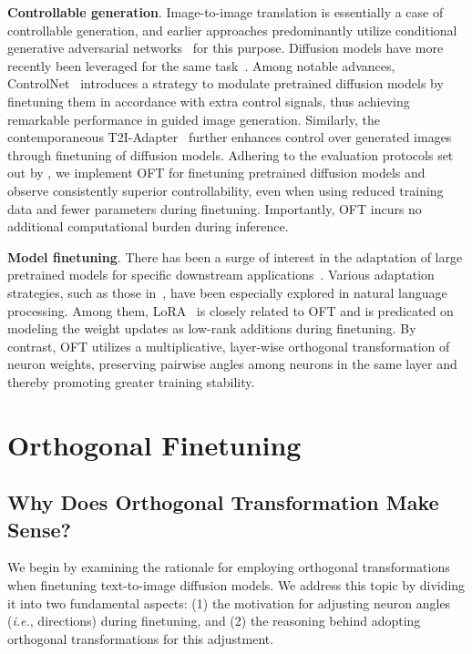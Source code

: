 \textbf{Controllable generation}. Image-to-image translation is essentially a case of controllable generation, and earlier approaches predominantly utilize conditional generative adversarial networks~\cite{isola2017image,zhu2017toward,wang2018high,park2019semantic,choi2018stargan} for this purpose. Diffusion models have more recently been leveraged for the same task~\cite{saharia2022palette,voynov2022sketch,wang2022pretraining}. Among notable advances, ControlNet~\cite{zhang2023adding} introduces a strategy to modulate pretrained diffusion models by finetuning them in accordance with extra control signals, thus achieving remarkable performance in guided image generation. Similarly, the contemporaneous T2I-Adapter~\cite{mou2023t2i} further enhances control over generated images through finetuning of diffusion models. Adhering to the evaluation protocols set out by \cite{zhang2023adding,mou2023t2i}, we implement OFT for finetuning pretrained diffusion models and observe consistently superior controllability, even when using reduced training data and fewer parameters during finetuning. Importantly, OFT incurs no additional computational burden during inference.

\textbf{Model finetuning}. There has been a surge of interest in the adaptation of large pretrained models for specific downstream applications~\cite{devlin2018bert,brown2020language,he2022masked}. Various adaptation strategies, such as those in~\cite{hulora2022,houlsby2019parameter,pfeiffer2020adapterfusion}, have been especially explored in natural language processing. Among them, LoRA~\cite{hulora2022} is closely related to OFT and is predicated on modeling the weight updates as low-rank additions during finetuning. By contrast, OFT utilizes a multiplicative, layer-wise orthogonal transformation of neuron weights, preserving pairwise angles among neurons in the same layer and thereby promoting greater training stability.

\section{Orthogonal Finetuning}

\subsection{Why Does Orthogonal Transformation Make Sense?}

We begin by examining the rationale for employing orthogonal transformations when finetuning text-to-image diffusion models. We address this topic by dividing it into two fundamental aspects: (1) the motivation for adjusting neuron angles (\emph{i.e.}, directions) during finetuning, and (2) the reasoning behind adopting orthogonal transformations for this adjustment.


